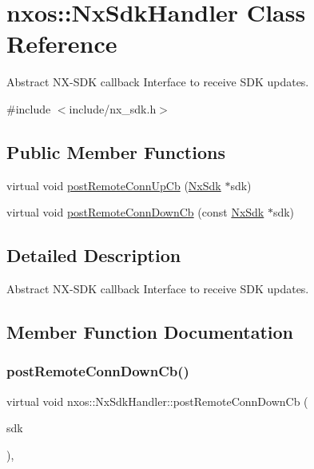 \hypertarget{classnxos_1_1_nx_sdk_handler}{}\section{nxos\+:\+:Nx\+Sdk\+Handler Class Reference}
\label{classnxos_1_1_nx_sdk_handler}


Abstract N\+X-\/\+S\+DK callback Interface to receive S\+DK updates.  




{\ttfamily \#include $<$include/nx\+\_\+sdk.\+h$>$}

\subsection*{Public Member Functions}
\begin{DoxyCompactItemize}
\item 
virtual void \mbox{\hyperlink{classnxos_1_1_nx_sdk_handler_a71b575abab99f8798635035986dbdc3f}{post\+Remote\+Conn\+Up\+Cb}} (\mbox{\hyperlink{classnxos_1_1_nx_sdk}{Nx\+Sdk}} $\ast$sdk)
\item 
virtual void \mbox{\hyperlink{classnxos_1_1_nx_sdk_handler_a433426269ae0b8374f3ead9f06edeb0b}{post\+Remote\+Conn\+Down\+Cb}} (const \mbox{\hyperlink{classnxos_1_1_nx_sdk}{Nx\+Sdk}} $\ast$sdk)
\end{DoxyCompactItemize}


\subsection{Detailed Description}
Abstract N\+X-\/\+S\+DK callback Interface to receive S\+DK updates. 

\subsection{Member Function Documentation}
\mbox{\label{classnxos_1_1_nx_sdk_handler_a433426269ae0b8374f3ead9f06edeb0b}} 
\subsubsection{\texorpdfstring{post\+Remote\+Conn\+Down\+Cb()}{postRemoteConnDownCb()}}
{\footnotesize\ttfamily virtual void nxos\+::\+Nx\+Sdk\+Handler\+::post\+Remote\+Conn\+Down\+Cb (\begin{DoxyParamCaption}\item[{const \mbox{\hyperlink{classnxos_1_1_nx_sdk}{Nx\+Sdk}} $\ast$}]{sdk }\end{DoxyParamCaption})\hspace{0.3cm}{\ttfamily [inline]}, {\ttfamily [virtual]}}


